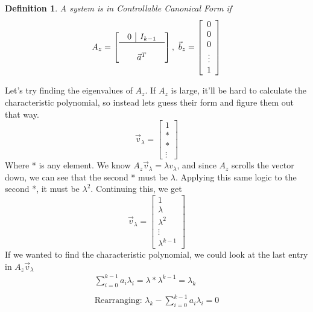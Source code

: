 \documentclass{article}
\newtheorem{definition}{Definition}
\begin{document}
\begin{definition}
    A system is in Controllable Canonical Form if
    \[
    A_z = \left[
        \begin{array}{c}
            \begin{array}{c|c}
                0 & I_{k-1}\\
            \end{array} \\
            \hline \\
            \vec{a}^T
        \end{array}
    \right],\ \vec{b}_z = \left[
        \begin{array}{c}
            0\\
            0\\
            0\\
            \vdots\\
            1
        \end{array}
    \right]
\]
\end{definition}
Let's try finding the eigenvalues of $A_z$. If $A_z$ is large, it'll be hard to calculate the characteristic polynomial, so instead lets guess their form and figure them out that way.
\[
    \vec{v}_\lambda = \left[
        \begin{array}{c}
            1\\
            *\\
            *\\
            \vdots
        \end{array}
    \right]
    \]
Where * is any element.
We know $A_z\vec{v}_\lambda=\lambda v_\lambda$, and since $A_z$ scrolls the vector down, we can see that the second * must be $\lambda$. Applying this same logic to the second *, it must be $\lambda^2$.
Continuing this, we get
\[
    \vec{v}_\lambda = \left[
        \begin{array}{c}
            1\\
            \lambda\\
            \lambda^2\\
            \vdots\\
            \lambda^{k-1}
        \end{array}
    \right]
    \]
If we wanted to find the characteristic polynomial, we could look at the last entry in $A_z\vec{v}_\lambda$
\[
    \begin{array}{c}
        \sum_{i=0}^{k-1}{a_i\lambda_i}=\lambda*\lambda^{k-1}=\lambda_k\\\\
        \text{Rearranging: }\lambda_k-\sum_{i=0}^{k-1}{a_i\lambda_i} = 0
    \end{array}
\]
\end{document}
